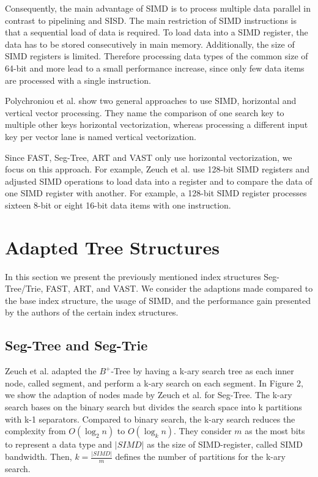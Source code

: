 \documentclass[conference]{IEEEtran}
\begin{document}
Consequently, the main advantage of SIMD is to process multiple data parallel in contrast to pipelining and SISD. The main restriction of SIMD instructions is that a sequential load of data is required. To load data into a SIMD register, the data has to be stored consecutively in main memory. Additionally, the size of SIMD registers is limited. Therefore processing data types of the common size of 64-bit and more lead to a small performance increase, since only few data items are processed with a single instruction.

Polychroniou et al. \cite{b7} show two general approaches to use SIMD, horizontal and vertical vector processing. They name the comparison of one search key to multiple other keys horizontal vectorization, whereas processing a different input key per vector lane is named vertical vectorization.

Since FAST, Seg-Tree, ART and VAST only use horizontal vectorization, we focus on this approach.  For example, Zeuch et al. \cite{b3} use 128-bit SIMD registers and adjusted SIMD operations to load data into a register and to compare the data of one SIMD register with another. For example, a 128-bit SIMD register processes sixteen 8-bit or eight 16-bit data items with one instruction. %


\section{Adapted Tree Structures}
In this section we present the previously mentioned index structures Seg-Tree/Trie, FAST, ART, and VAST. We consider the adaptions made compared to the base index structure, the usage of SIMD, and the performance gain presented by the authors of the certain index structures.
\subsection{Seg-Tree and Seg-Trie}\label{SCM}
Zeuch et al. adapted the $B^+$-Tree by having a k-ary search tree as each inner node, called segment, and perform a k-ary search on each segment.  In Figure 2, we show the adaption of nodes made by Zeuch et al. for Seg-Tree. The k-ary search bases on the binary search but divides the search space into k partitions with k-1 separators. Compared to binary search, the k-ary search reduces the complexity from $O(\log_{2}{n})$ to $O(\log_{k}{n})$. They consider $m$ as the most bits to represent a data type and $\vert SIMD \vert$ as the size of SIMD-register, called SIMD bandwidth. Then, $k = \frac{\vert SIMD \vert }{m}$ defines the number of partitions for the k-ary search. 
\end{document}
